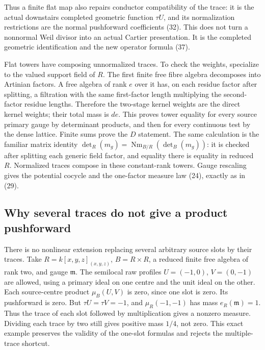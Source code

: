 \documentclass[11pt]{article}
\begin{document}
Thus a finite flat map also repairs conductor compatibility
of the trace: it is the actual downstairs completed geometric
function \(\tau U\), and its normalization restrictions are
the normal pushforward coefficients (32). This does not turn
a nonnormal Weil divisor into an actual Cartier presentation.
It is the completed geometric identification and the new
operator formula (37).

Flat towers have composing unnormalized traces. To check
the weights, specialize to the valued support field of \(R\).
The first finite free fibre algebra decomposes into
Artinian factors. A free algebra of rank \(e\) over it
has, on each residue factor after splitting, a filtration
with the same first-factor length multiplying the
second-factor residue lengths. Therefore the two-stage
kernel weights are the direct kernel weights; their
total mass is \(de\). This proves tower equality for
every source primary gauge by determinant products, and
then for every continuous test by the dense lattice.
Finite sums prove the \(D\) statement. The same calculation
is the familiar matrix identity
\(\det_R(m_g)=\operatorname{Nm}_{B/R}(\det_B(m_g))\):
it is checked after splitting each generic field factor,
and equality there is equality in reduced \(R\).
Normalized traces compose in these constant-rank towers.
Gauge rescaling gives the potential cocycle and the
one-factor measure law (24), exactly as in (29).

\subsection*{Why several traces do not give a product pushforward}
There is no nonlinear extension replacing several arbitrary
source slots by their traces. Take
\(R=k[x,y,z]_{(x,y,z)}\), \(B=R\times R\), a reduced finite
free algebra of rank two, and gauge \(\mathfrak m\).
The semilocal raw profiles \(U=(-1,0)\), \(V=(0,-1)\)
are allowed, using a primary ideal on one centre and the
unit ideal on the other. Each source-centre product
\(\mu_B(U,V)\) is zero, since one slot is zero. Its
pushforward is zero. But \(\tau U=\tau V=-1\), and
\(\mu_R(-1,-1)\) has mass \(e_R(\mathfrak m)=1\).
Thus the trace of each slot followed by multiplication
gives a nonzero measure. Dividing each trace by two
still gives positive mass \(1/4\), not zero.
This exact example preserves the validity of the
one-slot formulas and rejects the multiple-trace shortcut.
\end{document}
